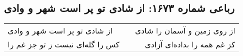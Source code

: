 \begin{center}
\section*{رباعی شماره ۱۶۷۳: از شادی تو پر است شهر و وادی}
\label{sec:1673}
\begin{longtable}{l p{0.5cm} r}
از شادی تو پر است شهر و وادی
&&
از روی زمین و آسمان را شادی
\\
کس را گله‌ای نیست ز تو جز غم را
&&
کز غم همه را بداده‌ای آزادی
\\
\end{longtable}
\end{center}
